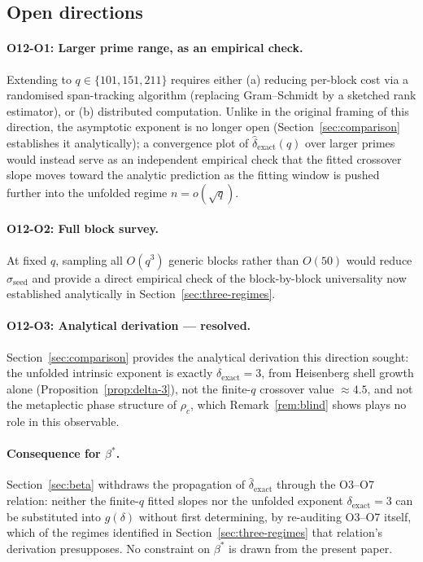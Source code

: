 \subsection{Open directions}

  \paragraph{O12-O1: Larger prime range, as an empirical check.}
    Extending to $q \in \{101, 151, 211\}$ requires either (a) reducing per-block cost
    via a randomised span-tracking algorithm (replacing Gram--Schmidt by a sketched
    rank estimator), or (b) distributed computation.
    Unlike in the original framing of this direction, the asymptotic exponent is no longer
    open (Section~\ref{sec:comparison} establishes it analytically); a convergence plot of
    $\hat{\delta}_{\mathrm{exact}}(q)$ over larger primes would instead serve as an
    independent empirical check that the fitted crossover slope moves toward the analytic
    prediction as the fitting window is pushed further into the unfolded regime $n=o(\sqrt q)$.

  \paragraph{O12-O2: Full block survey.}
    At fixed $q$, sampling all $O(q^3)$ generic blocks rather than $O(50)$ would
    reduce $\sigma_{\mathrm{seed}}$ and provide a direct empirical check of the
    block-by-block universality now established analytically in
    Section~\ref{sec:three-regimes}.

  \paragraph{O12-O3: Analytical derivation — resolved.}
    Section~\ref{sec:comparison} provides the analytical derivation this direction sought:
    the unfolded intrinsic exponent is exactly $\delta_{\mathrm{exact}}=3$, from Heisenberg
    shell growth alone (Proposition~\ref{prop:delta-3}), not the finite-$q$ crossover value
    $\approx 4.5$, and not the metaplectic phase structure of $\rho_c$, which
    Remark~\ref{rem:blind} shows plays no role in this observable.

  \paragraph{Consequence for $\beta^*$.}
    Section~\ref{sec:beta} withdraws the propagation of $\hat{\delta}_{\mathrm{exact}}$
    through the O3--O7 relation: neither the finite-$q$ fitted slopes nor the unfolded
    exponent $\delta_{\mathrm{exact}}=3$ can be substituted into $g(\delta)$ without first
    determining, by re-auditing O3--O7 itself, which of the regimes identified in
    Section~\ref{sec:three-regimes} that relation's derivation presupposes.
    No constraint on $\beta^*$ is drawn from the present paper.
